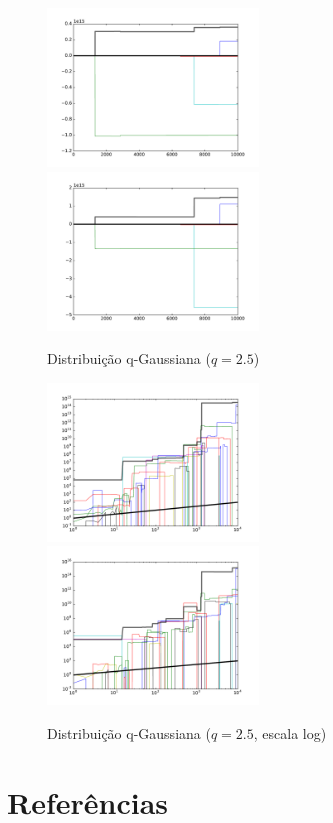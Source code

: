 \documentclass[12pt,a4paper,hidelinks]{article}
\begin{document}
  \pagebreak

  \begin{figure}[htb]
    \caption{Distribuição q-Gaussiana ($q = 2.5$)}
    \includegraphics[width=0.5\textwidth]{figures/2_5__0.pdf}
    \includegraphics[width=0.5\textwidth]{figures/2_5__1.pdf}
    \label{fig:randomwalk_q-gaussian_2.5}
  \end{figure}

  \begin{figure}[htb]
    \caption{Distribuição q-Gaussiana ($q = 2.5$, escala log)}
    \includegraphics[width=0.5\textwidth]{figures/2_5__0__log.pdf}
    \includegraphics[width=0.5\textwidth]{figures/2_5__1__log.pdf}
    \label{fig:randomwalk_q-gaussian_2.5_log}
  \end{figure}

  \pagebreak

  \section{Referências}
    \vspace{-10mm}
    
    

\end{document}
